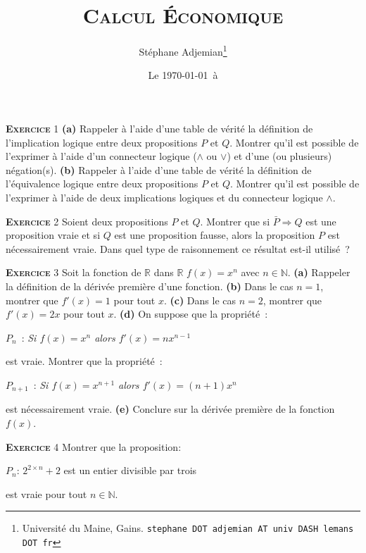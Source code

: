\documentclass[10pt,a4paper,notitlepage,twocolumn]{article}
\newcommand{\exercice}[1]{\textsc{\textbf{Exercice}} #1}
\begin{document}
\title{\textsc{Calcul Économique}}
\author{Stéphane Adjemian\thanks{Université du Maine, Gains. \texttt{stephane DOT adjemian AT univ DASH lemans DOT fr}}}
\date{Le \today\ à \thistime}

\maketitle
\thispagestyle{empty}

\exercice{1} \textbf{(a)} Rappeler à l'aide d'une table de vérité la définition de l'implication logique entre deux propositions $P$ et $Q$. Montrer qu'il est possible de l'exprimer à l'aide d'un connecteur logique ($\land$ ou $\lor$) et d'une (ou plusieurs) négation(s). \textbf{(b)} Rappeler à l'aide d'une table de vérité la définition de l'équivalence logique entre deux propositions $P$ et $Q$. Montrer qu'il est possible de l'exprimer à l'aide de deux implications logiques et du connecteur logique $\land$.

\bigskip

\exercice{2} Soient deux propositions $P$ et $Q$. Montrer que si $\bar P \Rightarrow Q$ est une proposition vraie et si $Q$ est une proposition fausse, alors la proposition $P$ est nécessairement vraie. Dans quel type de raisonnement ce résultat est-il utilisé ?
	
\bigskip

\exercice{3} Soit la fonction de $\mathbb R$ dans $\mathbb R$ $f(x) = x^n$ avec $n\in\mathbb N$. \textbf{(a)} Rappeler la définition de la dérivée première d'une fonction. \textbf{(b)} Dans le cas $n=1$, montrer que $f'(x) = 1$ pour tout $x$. \textbf{(c)} Dans le cas $n=2$, montrer que $f'(x) = 2x$ pour tout $x$. \textbf{(d)} On suppose que la propriété :
\begin{center}
$P_{n}$ : \textit{Si $f(x)=x^{n}$ alors $f'(x) = n x^{n-1}$}  
\end{center}
est vraie. Montrer que la propriété :
\begin{center}
$P_{n+1}$ : \textit{Si $f(x)=x^{n+1}$ alors $f'(x) = (n+1) x^{n}$}  
\end{center}
 est nécessairement vraie. \textbf{(e)} Conclure sur la dérivée première de la fonction $f(x)$.

\bigskip

\exercice{4} Montrer que la proposition:
\begin{center}
  $P_n$: $2^{2\times n}+2$ est un entier divisible par trois
\end{center}
est vraie pour tout $n\in\mathbb N$.
\end{document}

